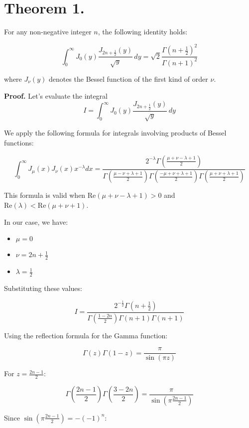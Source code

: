\documentclass{article}
\begin{document}
\section*{Theorem 1.}

For any non-negative integer $n$, the following identity holds:

$$\int_0^{\infty} J_0 (y) \frac{J_{2 n + \frac{1}{2}} (y)}{\sqrt{y}} \, dy = \sqrt{2} \frac{\Gamma (n + \frac{1}{2})^2}{\Gamma (n + 1)^2}$$

where $J_{\nu} (y)$ denotes the Bessel function of the first kind of order $\nu$.

\textbf{Proof.} 
Let's evaluate the integral
$$I = \int_0^{\infty} J_0 (y) \frac{J_{2 n + \frac{1}{2}} (y)}{\sqrt{y}} \, dy$$

We apply the following formula for integrals involving products of Bessel functions:

$$\int_0^{\infty} J_{\mu} (x) J_{\nu} (x) x^{- \lambda} dx = \frac{2^{- \lambda} \Gamma \left( \frac{\mu + \nu - \lambda + 1}{2} \right)}{\Gamma \left( \frac{\mu - \nu + \lambda + 1}{2} \right) \Gamma \left( \frac{- \mu + \nu + \lambda + 1}{2} \right) \Gamma \left( \frac{\mu + \nu + \lambda + 1}{2} \right)}$$

This formula is valid when $\text{Re}(\mu + \nu - \lambda + 1) > 0$ and $\text{Re}(\lambda) < \text{Re}(\mu + \nu + 1)$.

In our case, we have:
\begin{itemize}
    \item $\mu = 0$
    \item $\nu = 2n + \frac{1}{2}$
    \item $\lambda = \frac{1}{2}$
\end{itemize}

Substituting these values:

$$I = \frac{2^{-\frac{1}{2}} \Gamma \left( n + \frac{1}{2} \right)}{\Gamma \left( \frac{1 - 2n}{2} \right) \Gamma \left( n + 1 \right) \Gamma \left( n + 1 \right)}$$

Using the reflection formula for the Gamma function:

$$\Gamma(z)\Gamma(1-z) = \frac{\pi}{\sin(\pi z)}$$

For $z = \frac{2n-1}{2}$:

$$\Gamma\left(\frac{2n-1}{2}\right)\Gamma\left(\frac{3-2n}{2}\right) = \frac{\pi}{\sin\left(\pi\frac{2n-1}{2}\right)}$$

Since $\sin\left(\pi\frac{2n-1}{2}\right) = -(-1)^n$:
\end{document}
